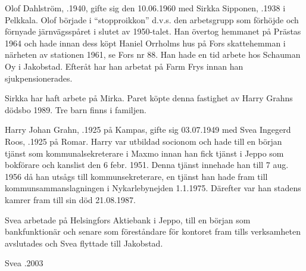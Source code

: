 


Olof Dahlström, .1940, gifte sig den 10.06.1960 med Sirkka Sipponen, .1938 i Pelkkala. Olof började i ``stopproikkon'' d.v.s. den arbetsgrupp som förhöjde och förnyade järnvägsspåret i slutet av 1950-talet. Han övertog hemmanet på Prästas 1964 och hade innan dess köpt Haniel Orrholms hus på Fors skattehemman i närheten av stationen 1961, se Fors nr 88. Han hade en tid arbete hos Schauman Oy i Jakobstad. Efteråt har han arbetat på Farm Frys innan han sjukpensionerades.

Sirkka har haft arbete på Mirka. Paret köpte denna fastighet av Harry Grahns dödsbo 1989. Tre barn finns i familjen.
\begin{jhchildren}
  \item {}
  \item {}
  \item {}
\end{jhchildren}


Harry Johan Grahn, .1925 på Kampas, gifte sig 03.07.1949 med Svea Ingegerd Roos, .1925 på Romar. Harry var utbildad socionom och hade till en början tjänst som kommunalsekreterare i Maxmo innan han fick tjänst i Jeppo som bokförare och kanslist den 6 febr. 1951. Denna tjänst innehade han till 7 aug. 1956 då han utsågs till kommunsekreterare, en tjänst han hade fram till kommunsammanslagningen i Nykarlebynejden 1.1.1975. Därefter var han stadens kamrer fram till sin död 21.08.1987.

Svea arbetade på Helsingfors Aktiebank i Jeppo, till en början som bankfunktionär och senare som föreståndare för kontoret fram tills verksamheten avslutades och Svea flyttade till Jakobstad.
\begin{jhchildren}
  \item {}
  \item {}
  \item {}
\end{jhchildren}
Svea .2003



